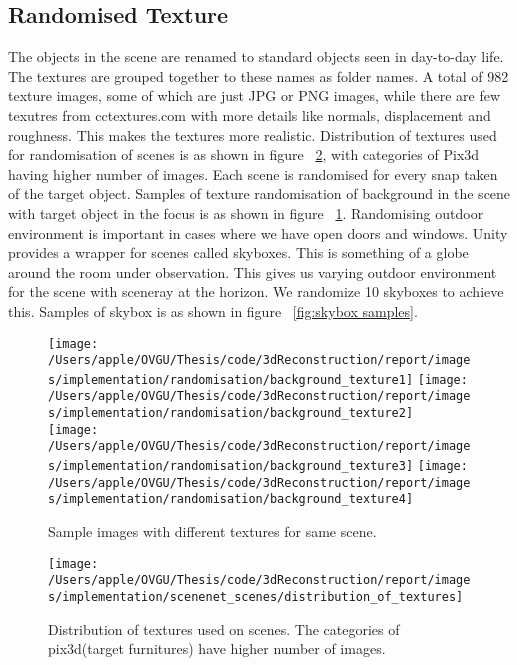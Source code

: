 \subsection{Randomised Texture}

The objects in the scene are renamed to standard objects seen in day-to-day life.
The textures are grouped together to these names as folder names.
A total of 982 texture images, some of which are just JPG or PNG images, while there are few texutres from cctextures.com with more details like normals, displacement and roughness.
This makes the textures more realistic.
Distribution of textures used for randomisation of scenes is as shown in figure ~\ref{fig:Distribution of textures}, with categories of Pix3d having higher number of images.
Each scene is randomised for every snap taken of the target object.
Samples of texture randomisation of background in the scene with target object in the focus is as shown in figure ~\ref{fig:Texture Randomisation}.
Randomising outdoor environment is important in cases where we have open doors and windows.
Unity provides a wrapper for scenes called skyboxes.
This is something of a globe around the room under observation.
This gives us varying outdoor environment for the scene with sceneray at the horizon.
We randomize 10 skyboxes to achieve this. Samples of skybox is as shown in figure ~\ref{fig:skybox samples}.


\begin{figure}
    \centering
    \texttt{[image: /Users/apple/OVGU/Thesis/code/3dReconstruction/report/images/implementation/randomisation/background\_texture1]}
    \texttt{[image: /Users/apple/OVGU/Thesis/code/3dReconstruction/report/images/implementation/randomisation/background\_texture2]}\\
    \vspace{0.1cm}
    \texttt{[image: /Users/apple/OVGU/Thesis/code/3dReconstruction/report/images/implementation/randomisation/background\_texture3]}
    \texttt{[image: /Users/apple/OVGU/Thesis/code/3dReconstruction/report/images/implementation/randomisation/background\_texture4]}\\
    \caption{Sample images with different textures for same scene.}
    \label{fig:Texture Randomisation}
\end{figure}

\begin{figure}
    \centering
    \texttt{[image: /Users/apple/OVGU/Thesis/code/3dReconstruction/report/images/implementation/scenenet\_scenes/distribution\_of\_textures]}
    \caption{Distribution of textures used on scenes. The categories of pix3d(target furnitures) have higher number of images.}
    \label{fig:Distribution of textures}
\end{figure}

